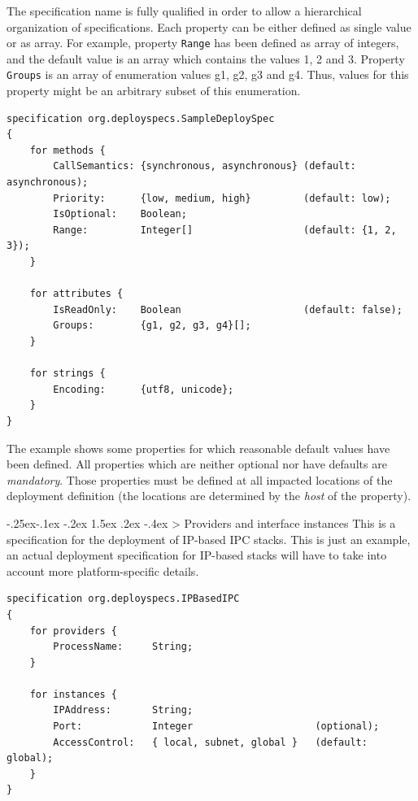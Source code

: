 \documentclass[a4paper,10pt]{scrreprt}
\makeatletter
\renewcommand\subsection{\medskip\@startsection{subsection}{2}{\z@}%
  {-.25ex\@plus -.1ex \@minus -.2ex}%
  {1.5ex \@plus .2ex \@minus -.4ex}%
  {\ifnum \scr@compatibility>\@nameuse{scr@v@2.96}\relax
    \setlength{\parfillskip}{\z@ plus 1fil}\fi
    \raggedsection\normalfont\sectfont\nobreak\size@subsection
  }%
}
\makeatother
\begin{document}
The specification name is fully qualified in order to allow a hierarchical 
organization of specifications. Each property can be either defined as single
value or as array. For example, property \protect\lstinline[language=FDeploy]{Range} has been defined
as array of integers, and the default value is an array which contains the 
values 1, 2 and 3. Property \protect\lstinline[language=FDeploy]{Groups} is an array of enumeration
values g1, g2, g3 and g4. Thus, values for this property might be an arbitrary subset
of this enumeration.


\begin{lstlisting}[language=FDeploy]
specification org.deployspecs.SampleDeploySpec
{
	for methods {
		CallSemantics: {synchronous, asynchronous} (default: asynchronous);
		Priority:      {low, medium, high}         (default: low);		
		IsOptional:    Boolean;
		Range:         Integer[]                   (default: {1, 2, 3});
	}
	
	for attributes {
		IsReadOnly:    Boolean                     (default: false);
		Groups:        {g1, g2, g3, g4}[];
	}
	
	for strings {
		Encoding:      {utf8, unicode};
	}
}
\end{lstlisting}

The example shows some properties for which reasonable default values have been defined.
All properties which are neither optional nor have defaults are \textit{mandatory}. Those
properties must be defined at all impacted locations of the deployment definition
(the locations are determined by the \textit{host} of the property).

\subsection{Providers and interface instances}
\label{DeploymentModels_Specifications_Providers}
This is a specification for the deployment of IP-based IPC stacks. This is just an
example, an actual deployment specification for IP-based stacks will have to take
into account more platform-specific details.


\begin{lstlisting}[language=FDeploy]
specification org.deployspecs.IPBasedIPC
{
	for providers {
		ProcessName:     String;
	}

	for instances {
		IPAddress:       String;
		Port:            Integer                     (optional);	
		AccessControl:   { local, subnet, global }   (default: global);
	}
}
\end{lstlisting}
\end{document}

